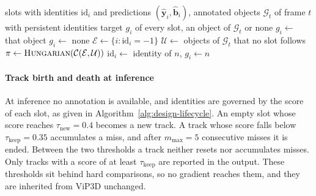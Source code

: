 \begin{algorithm}[htbp]
    \caption{Identity assignment and supervision targets for one frame during training}
    \label{alg:design-assign}
    \begin{algorithmic}[1]
        \Require slots with identities $\mathrm{id}_i$ and predictions $(\hat{\mathbf{y}}_i, \hat{\mathbf{b}}_i)$,
        annotated objects $\mathcal{G}_t$ of frame $t$ with persistent identities
        \Ensure target $g_i$ of every slot, an object of $\mathcal{G}_t$ or none
                \State $g_i \gets$ that object 
            \Else
                \State $g_i \gets$ none 
            \EndIf
        \EndFor
        \State $\mathcal{E} \gets \{ i : \mathrm{id}_i = -1 \}$ 
        \State $\mathcal{U} \gets$ objects of $\mathcal{G}_t$ that no slot follows 
        \State $\pi \gets \Call{Hungarian}{\mathcal{C}(\mathcal{E}, \mathcal{U})}$  
            \State $\mathrm{id}_i \gets$ identity of $n$, \quad $g_i \gets n$ 
        \EndFor
    \end{algorithmic}
\end{algorithm}

\paragraph{Track birth and death at inference}
At inference no annotation is available, and identities are governed by the score of each slot, as given in
Algorithm~\ref{alg:design-lifecycle}. An empty slot whose score reaches $\tau_{\mathrm{new}} = 0.4$ becomes a
new track. A track whose score falls below $\tau_{\mathrm{keep}} = 0.35$ accumulates a miss, and after
$m_{\max} = 5$ consecutive misses it is ended. Between the two thresholds a track neither resets nor
accumulates misses. Only tracks with a score of at least $\tau_{\mathrm{keep}}$
are reported in the output. These thresholds sit behind hard comparisons, so no gradient reaches them, and
they are inherited from ViP3D unchanged.

